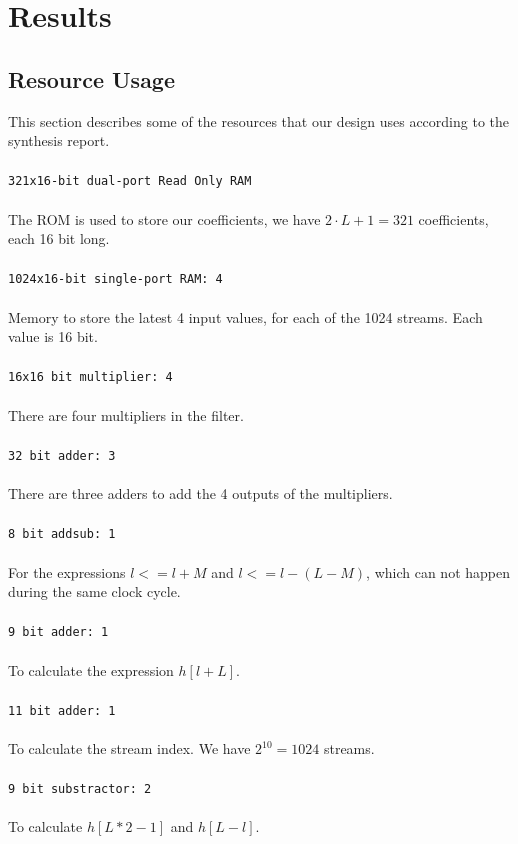 \section{Results}
\subsection{Resource Usage}
This section describes some of the resources that our design uses according to the synthesis report.\\
\\
\texttt{321x16-bit dual-port Read Only RAM}\\
\\
The ROM is used to store our coefficients, we have $2\cdot L + 1 = 321$ coefficients, each 16 bit long.\\
\\
\texttt{1024x16-bit single-port RAM: 4}\\
\\
Memory to store the latest 4 input values, for each of the 1024 streams. Each value is 16 bit.\\
\\
\texttt{16x16 bit multiplier: 4}\\
\\
There are four multipliers in the filter.\\
\\
\texttt{32 bit adder: 3}\\
\\
There are three adders to add the 4 outputs of the multipliers.\\
\\
\texttt{8 bit addsub: 1}\\
\\
For the expressions $l <= l + M$  and $l <= l - (L - M)$, which can not happen during the same clock cycle.\\
\\ 
\texttt{9 bit adder: 1}\\
\\
To calculate the expression $h[l + L]$.\\
\\
\texttt{11 bit adder: 1}\\
\\
To calculate the stream index. We have $2^{10} = 1024$ streams.\\
\\
\texttt{9 bit substractor: 2}\\
\\
To calculate $h[L*2-1]$ and $h[L-l]$.
